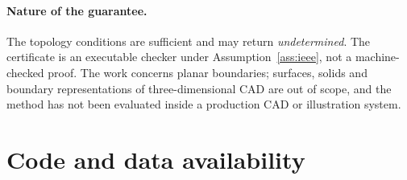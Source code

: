 \documentclass[11pt,a4paper]{article}
\theoremstyle{definition}
\theoremstyle{remark}
\begin{document}
\paragraph{Nature of the guarantee.} The topology conditions are sufficient
and may return \emph{undetermined}. The certificate is an executable checker
under Assumption~\ref{ass:ieee}, not a machine-checked proof. The work
concerns planar boundaries; surfaces, solids and boundary representations of
three-dimensional CAD are out of scope, and the method has not been
evaluated inside a production CAD or illustration system.


\section{Code and data availability}\label{sec:availability}
\end{document}
